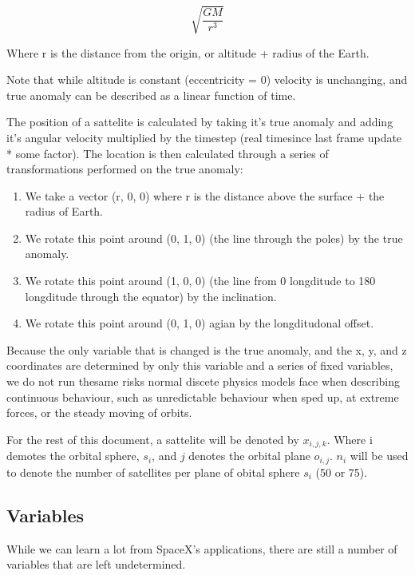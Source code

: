 \documentclass[12pt]{article}
\begin{document}
\[\sqrt{\frac{GM}{r^3}}\]

Where r is the distance from the origin, or altitude + radius of the Earth.

Note that while altitude is constant (eccentricity = 0) velocity is unchanging, and true anomaly can be described as a linear function of time.

The position of a sattelite is calculated by taking it’s true anomaly and adding it’s angular velocity multiplied by the timestep (real timesince last frame update * some factor). The location is then calculated through a series of transformations performed on the true anomaly:

\begin{enumerate}
\item We take a vector (r, 0, 0) where r is the distance above the surface + the radius of Earth.
\item We rotate this point around (0, 1, 0) (the line through the poles) by the true anomaly.
\item We rotate this point around (1, 0, 0) (the line from 0 longditude to 180 longditude through the equator) by the inclination.
\item We rotate this point around (0, 1, 0) agian by the longditudonal offset.
\end{enumerate}

Because the only variable that is changed is the true anomaly, and the x, y, and z coordinates are determined by only this variable and a series of fixed variables, we do not run thesame risks normal discete physics models face when describing continuous behaviour, such as unredictable behaviour when sped up, at extreme forces, or the steady moving of orbits.

For the rest of this document, a sattelite will be denoted by $x_{i,j,k}$. Where i demotes the orbital sphere, $s_i$, and $j$ denotes the orbital plane $o_{i,j}$. $n_i$ will be used to denote the number of satellites per plane of obital sphere $s_i$ (50 or 75).

\subsection{Variables}
While we can learn a lot from SpaceX's applications, there are still a number of variables that are left undetermined. 
\end{document}
